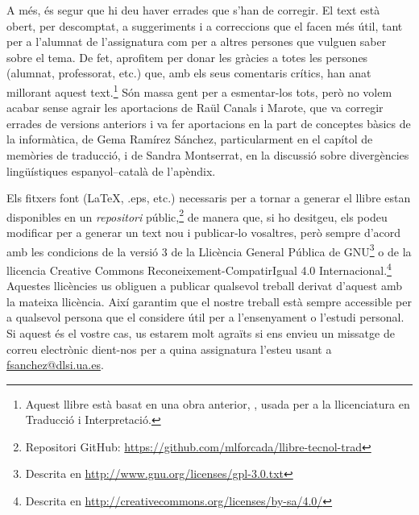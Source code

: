 A més, és segur que hi deu haver errades que s'han de corregir. El
text està obert, per descomptat, a suggeriments i a correccions que el
facen més útil, tant per a l'alumnat de l'assignatura com per a altres
persones que vulguen saber sobre el tema.  De fet, aprofitem per donar
les gràcies a totes les persones (alumnat, professorat, etc.)  que,
amb els seus comentaris crítics, han anat millorant aquest
text.\footnote{Aquest llibre està basat en una obra anterior,
  \protect\citep{forcada09b}, usada per a la llicenciatura en
  Traducció i Interpretació.}  Són massa gent per a esmentar-los tots,
però no volem acabar sense agrair les aportacions de Raül Canals i
Marote, que va corregir errades de versions anteriors i va fer
aportacions en la part de conceptes bàsics de la informàtica, de Gema
Ramírez Sánchez, particularment en el capítol de memòries de
traducció, i de Sandra Montserrat, en la discussió sobre divergències
lingüístiques espanyol--català de l'apèndix.


Els fitxers font (\LaTeX, .eps, etc.) necessaris per a tornar
a generar el llibre estan disponibles en un \emph{repositori} públic,\footnote{Repositori GitHub: \url{https://github.com/mlforcada/llibre-tecnol-trad}} de manera que, si ho desitgeu, els podeu
modificar per a generar un text nou i publicar-lo vosaltres, però
sempre d'acord amb les condicions de la versió 3 de la Llicència General Pública de
GNU\footnote{Descrita en
\url{http://www.gnu.org/licenses/gpl-3.0.txt}} o de la llicencia
Creative Commons Reconeixement-CompatirIgual 4.0 Internacional.\footnote{Descrita en
\url{http://creativecommons.org/licenses/by-sa/4.0/}} Aquestes
llicències us obliguen a publicar qualsevol treball
derivat d'aquest amb la mateixa llicència. Així garantim que el nostre
treball està sempre accessible per a qualsevol persona que el
considere útil per a l'ensenyament o l'estudi personal. Si aquest és el vostre cas,
us estarem molt agraïts si ens envieu un missatge de correu electrònic dient-nos
per a quina assignatura l'esteu usant a \url{fsanchez@dlsi.ua.es}.
